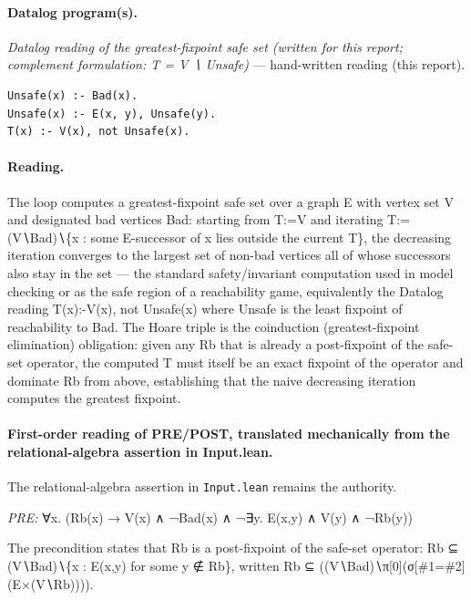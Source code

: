 \documentclass[10pt]{article}
\begin{document}
\paragraph{Datalog program(s).}

{\raggedright\textit{Datalog reading of the greatest-fixpoint safe set (written for this report; complement formulation: T = V ∖ Unsafe)} --- hand-written reading (this report).\par}

\begin{Verbatim}[fontsize=\scriptsize,breaklines=true,breakanywhere=true,frame=single,framesep=1.5mm]
Unsafe(x) :- Bad(x).
Unsafe(x) :- E(x, y), Unsafe(y).
T(x) :- V(x), not Unsafe(x).
\end{Verbatim}

\paragraph{Reading.} The loop computes a greatest-fixpoint safe set over a graph E with vertex set V and designated bad vertices Bad: starting from T:=V and iterating T:=(V∖Bad)∖\{x : some E-successor of x lies outside the current T\}, the decreasing iteration converges to the largest set of non-bad vertices all of whose successors also stay in the set --- the standard safety/invariant computation used in model checking or as the safe region of a reachability game, equivalently the Datalog reading T(x):-V(x), not Unsafe(x) where Unsafe is the least fixpoint of reachability to Bad. The Hoare triple is the coinduction (greatest-fixpoint elimination) obligation: given any Rb that is already a post-fixpoint of the safe-set operator, the computed T must itself be an exact fixpoint of the operator and dominate Rb from above, establishing that the naive decreasing iteration computes the greatest fixpoint.

\paragraph{First-order reading of PRE/POST, translated mechanically from the relational-algebra assertion in Input.lean.} The relational-algebra assertion in \texttt{Input.lean} remains the authority.

\textit{PRE:} ∀x. (Rb(x) → V(x) ∧ ¬Bad(x) ∧ ¬∃y. E(x,y) ∧ V(y) ∧ ¬Rb(y))\par The precondition states that Rb is a post-fixpoint of the safe-set operator: Rb ⊆ (V∖Bad)∖\{x : E(x,y) for some y ∉ Rb\}, written Rb ⊆ ((V∖Bad)∖π[0](σ[\#1=\#2](E×(V∖Rb)))).
\end{document}
